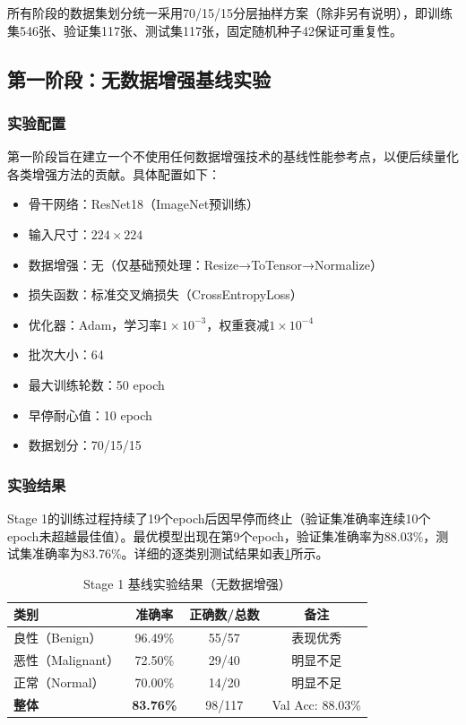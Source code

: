 所有阶段的数据集划分统一采用70/15/15分层抽样方案（除非另有说明），即训练集546张、验证集117张、测试集117张，固定随机种子42保证可重复性。


\subsection{第一阶段：无数据增强基线实验}

\subsubsection{实验配置}

第一阶段旨在建立一个不使用任何数据增强技术的基线性能参考点，以便后续量化各类增强方法的贡献。具体配置如下：

\begin{itemize}
    \item 骨干网络：ResNet18（ImageNet预训练）
    \item 输入尺寸：$224\times224$
    \item 数据增强：无（仅基础预处理：Resize→ToTensor→Normalize）
    \item 损失函数：标准交叉熵损失（CrossEntropyLoss）
    \item 优化器：Adam，学习率$1\times10^{-3}$，权重衰减$1\times10^{-4}$
    \item 批次大小：64
    \item 最大训练轮数：50 epoch
    \item 早停耐心值：10 epoch
    \item 数据划分：70/15/15
\end{itemize}

\subsubsection{实验结果}

Stage 1的训练过程持续了19个epoch后因早停而终止（验证集准确率连续10个epoch未超越最佳值）。最优模型出现在第9个epoch，验证集准确率为88.03\%，测试集准确率为83.76\%。详细的逐类别测试结果如表\ref{tbl:stage1_results}所示。

\begin{table}[htb]
    \centering
    \caption{Stage 1 基线实验结果（无数据增强）}
    \label{tbl:stage1_results}
    \begin{tabular}{lccc}
        \toprule
        类别 & 准确率 & 正确数/总数 & 备注 \\
        \midrule
        良性（Benign）    & 96.49\% & 55/57  & 表现优秀 \\
        恶性（Malignant） & 72.50\% & 29/40  & 明显不足 \\
        正常（Normal）   & 70.00\% & 14/20  & 明显不足 \\
        \midrule
        \textbf{整体}    & \textbf{83.76\%} & 98/117 & Val Acc: 88.03\% \\
        \bottomrule
    \end{tabular}
\end{table}

